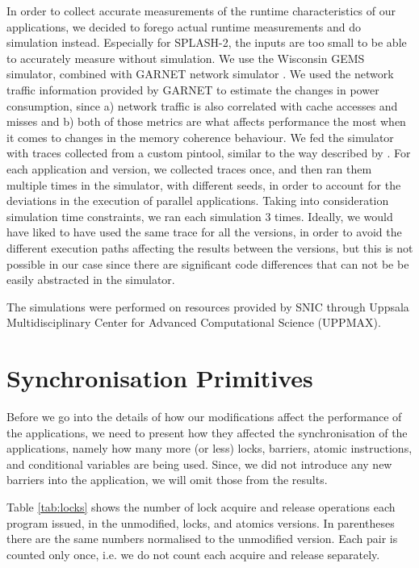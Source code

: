 In order to collect accurate measurements of the runtime characteristics of our
applications, we decided to forego actual runtime measurements and do simulation
instead. Especially for SPLASH-2, the inputs are too small to be able to
accurately measure without simulation. We use the Wisconsin GEMS
\cite{martin2005multifacet} simulator, combined with GARNET network simulator
\cite{agarwal2009garnet}. We used the network traffic information provided by
GARNET to estimate the changes in power consumption, since a) network traffic is
also correlated with cache accesses and misses and b) both of those metrics are
what affects performance the most when it comes to changes in the memory
coherence behaviour. We fed the simulator with traces collected from a custom
pintool, similar to the way described by
\cite{monchiero2009simulate,nilakantansynchrotrace}. For each application
and version, we collected traces once, and then ran them multiple times in the
simulator, with different seeds, in order to account for the deviations in the
execution of parallel applications. Taking into consideration simulation time
constraints, we ran each simulation 3 times.  Ideally, we would have liked to
have used the same trace for all the versions, in order to avoid  the different
execution paths affecting the results between the versions, but this is not
possible in our case since there are significant code differences that can not
be be easily abstracted in the simulator.

The simulations were performed on resources provided by SNIC through Uppsala
Multidisciplinary Center for Advanced Computational Science (UPPMAX).

\section{Synchronisation Primitives}
\label{sec:res_sync}

Before we go into the details of how our modifications affect the performance of
the applications, we need to present how they affected the synchronisation of
the applications, namely how many more (or less) locks, barriers, atomic
instructions, and conditional variables are being used. Since, we did not
introduce any new barriers into the application, we will omit those from the
results.

Table \ref{tab:locks} shows the number of lock acquire and release operations
each program issued, in the unmodified, locks, and atomics versions. In parentheses
there are the same numbers normalised to the unmodified version. Each pair is counted
only once, i.e. we do not count each acquire and release separately.

